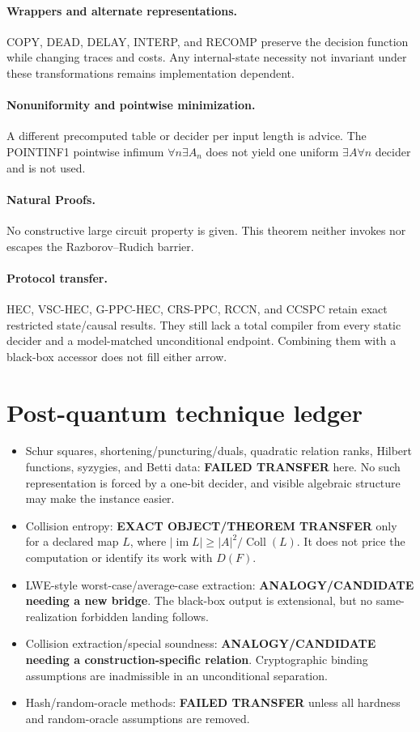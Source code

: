 \documentclass[11pt]{article}
\begin{document}
\paragraph{Wrappers and alternate representations.}
COPY, DEAD, DELAY, INTERP, and RECOMP preserve the decision function while
changing traces and costs.  Any internal-state necessity not invariant under
these transformations remains implementation dependent.

\paragraph{Nonuniformity and pointwise minimization.}
A different precomputed table or decider per input length is advice.  The
POINTINF1 pointwise infimum \(\forall n\exists A_n\) does not yield one
uniform \(\exists A\forall n\) decider and is not used.

\paragraph{Natural Proofs.}
No constructive large circuit property is given.  This theorem neither
invokes nor escapes the Razborov--Rudich barrier.

\paragraph{Protocol transfer.}
HEC, VSC-HEC, G-PPC-HEC, CRS-PPC, RCCN, and CCSPC retain exact restricted
state/causal results.  They still lack a total compiler from every static
decider and a model-matched unconditional endpoint.  Combining them with a
black-box accessor does not fill either arrow.

\section{Post-quantum technique ledger}
\begin{itemize}[leftmargin=*]
\item Schur squares, shortening/puncturing/duals, quadratic relation ranks,
Hilbert functions, syzygies, and Betti data: \textbf{FAILED TRANSFER} here.
No such representation is forced by a one-bit decider, and visible algebraic
structure may make the instance easier.
\item Collision entropy: \textbf{EXACT OBJECT/THEOREM TRANSFER} only for a
declared map \(L\), where
\(|\operatorname{im}L|\ge |A|^2/\operatorname{Coll}(L)\).  It does not price
the computation or identify its work with \(D(F)\).
\item LWE-style worst-case/average-case extraction:
\textbf{ANALOGY/CANDIDATE needing a new bridge}.  The black-box output is
extensional, but no same-realization forbidden landing follows.
\item Collision extraction/special soundness:
\textbf{ANALOGY/CANDIDATE needing a construction-specific relation}.
Cryptographic binding assumptions are inadmissible in an unconditional
separation.
\item Hash/random-oracle methods: \textbf{FAILED TRANSFER} unless all
hardness and random-oracle assumptions are removed.
\end{itemize}
\end{document}
